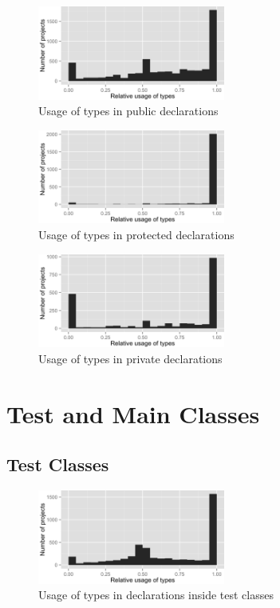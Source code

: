 \begin{figure}[h]
\centering 
\includegraphics[width=0.55\textwidth]{../aosd_2014/analysis/result/all/histograms/13_Public.png} 
\caption{Usage of types in public declarations}
\end{figure}

\begin{figure}[h]
\centering 
\includegraphics[width=0.55\textwidth]{../aosd_2014/analysis/result/all/histograms/12_Protected.png} 
\caption{Usage of types in protected declarations}
\end{figure}

\begin{figure}[h]
\centering 
\includegraphics[width=0.55\textwidth]{../aosd_2014/analysis/result/all/histograms/11_Private.png} 
\caption{Usage of types in private declarations}
\end{figure}

\FloatBarrier
\section{Test and Main Classes\label{a:test}}

\subsection*{Test Classes}
\begin{figure}[h]
\centering 
\includegraphics[width=0.55\textwidth]{../aosd_2014/analysis/result/test/test/histograms/5_all.png} 
\caption{Usage of types in declarations inside test classes}
\end{figure}

